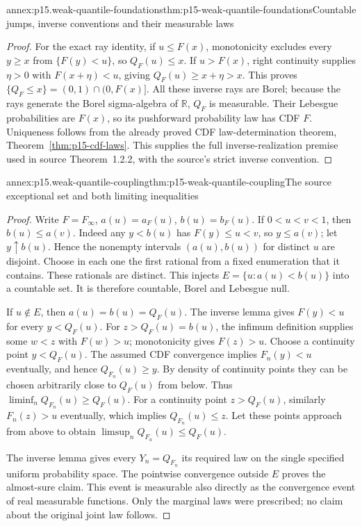 \begin{annexitem}{annex:p15.weak-quantile-foundations}{thm:p15-weak-quantile-foundations}{Countable jumps, inverse conventions and their measurable laws}
\begin{proof}
For the exact ray identity, if \(u\leq F(x)\), monotonicity
excludes every \(y\geq x\) from \(\{F(y)<u\}\), so \(Q_F(u)\leq x\).
If \(u>F(x)\), right continuity supplies \(\eta>0\) with
\(F(x+\eta)<u\), giving \(Q_F(u)\geq x+\eta>x\).
This proves
\(\{Q_F\leq x\}=(0,1)\cap(0,F(x)]\).
All these inverse rays are Borel; because the rays generate the
Borel sigma-algebra of \(\mathbb R\), \(Q_F\) is measurable.
Their Lebesgue probabilities are \(F(x)\), so its pushforward
probability law has CDF \(F\). Uniqueness follows from the
already proved CDF law-determination theorem,
Theorem~\ref{thm:p15-cdf-laws}.
This supplies the full inverse-realization premise used in
source Theorem~1.2.2, with the source's strict inverse convention.
\end{proof}
\end{annexitem}

\begin{annexitem}{annex:p15.weak-quantile-coupling}{thm:p15-weak-quantile-coupling}{The source exceptional set and both limiting inequalities}
\begin{proof}
Write \(F=F_\infty\), \(a(u)=a_F(u)\), \(b(u)=b_F(u)\).
If \(0<u<v<1\), then \(b(u)\leq a(v)\).
Indeed any \(y<b(u)\) has \(F(y)\leq u<v\), so \(y\leq a(v)\);
let \(y\uparrow b(u)\). Hence the nonempty intervals
\((a(u),b(u))\) for distinct \(u\) are disjoint.
Choose in each one the first rational from a fixed enumeration
that it contains. These rationals are distinct. This injects
\(E=\{u:a(u)<b(u)\}\) into a countable set.
It is therefore countable, Borel and Lebesgue null.

If \(u\notin E\), then \(a(u)=b(u)=Q_F(u)\).
The inverse lemma gives \(F(y)<u\) for every \(y<Q_F(u)\).
For \(z>Q_F(u)=b(u)\), the infimum definition supplies some
\(w<z\) with \(F(w)>u\); monotonicity gives \(F(z)>u\).
Choose a continuity point \(y<Q_F(u)\).
The assumed CDF convergence implies \(F_n(y)<u\) eventually,
and hence \(Q_{F_n}(u)\geq y\).
By density of continuity points they can be chosen arbitrarily
close to \(Q_F(u)\) from below. Thus
\(\liminf_nQ_{F_n}(u)\geq Q_F(u)\).
For a continuity point \(z>Q_F(u)\), similarly \(F_n(z)>u\)
eventually, which implies \(Q_{F_n}(u)\leq z\).
Let these points approach from above to obtain
\(\limsup_nQ_{F_n}(u)\leq Q_F(u)\).

The inverse lemma gives every \(Y_n=Q_{F_n}\) its required
law on the single specified uniform probability space.
The pointwise convergence outside \(E\) proves the almost-sure
claim. This event is measurable also directly as the convergence
event of real measurable functions. Only the marginal laws
were prescribed; no claim about the original joint law follows.
\end{proof}
\end{annexitem}

